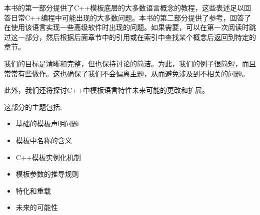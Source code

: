 本书的第一部分提供了C++模板底层的大多数语言概念的教程，这些表述足以回答日常C++编程中可能出现的大多数问题。本书的第二部分提供了参考，回答了在使用该语言实现一些高级软件时出现的问题。如果需要，可以在第一次阅读时跳过这一部分，然后根据后面章节中的引用或在索引中查找某个概念后返回到特定的章节。

我们的目标是清晰和完整，但也保持讨论的简洁。为此，我们的例子很简短，而且常常有些做作。这也确保了我们不会偏离主题，从而避免涉及到不相关的问题。

此外，我们还将探讨C++中模板语言特性未来可能的更改和扩展。

这部分的主题包括:

\begin{itemize}
\item 
基础的模板声明问题

\item 
模板中名称的含义

\item 
C++模板实例化机制

\item 
模板参数的推导规则

\item 
特化和重载

\item 
未来的可能性
\end{itemize}
	
	
	
	
	